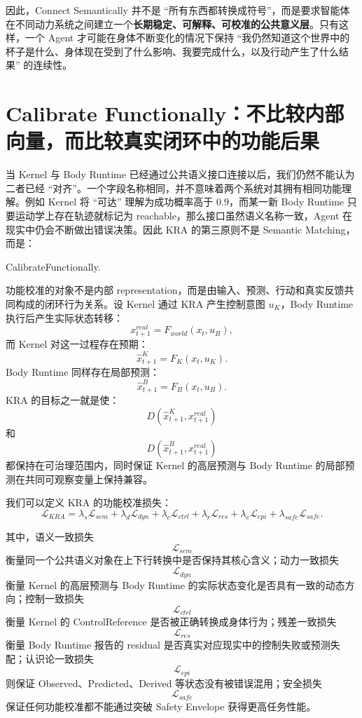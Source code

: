 因此，Connect Semantically 并不是 ``所有东西都转换成符号''，而是要求智能体在不同动力系统之间建立一个\textbf{长期稳定、可解释、可校准的公共意义层}。只有这样，一个 Agent 才可能在身体不断变化的情况下保持 ``我仍然知道这个世界中的杯子是什么、身体现在受到了什么影响、我要完成什么，以及行动产生了什么结果'' 的连续性。

\section{Calibrate Functionally：不比较内部向量，而比较真实闭环中的功能后果}

当 Kernel 与 Body Runtime 已经通过公共语义接口连接以后，我们仍然不能认为二者已经 ``对齐''。一个字段名称相同，并不意味着两个系统对其拥有相同功能理解。例如 Kernel 将 ``可达'' 理解为成功概率高于 $0.9$，而某一新 Body Runtime 只要运动学上存在轨迹就标记为 reachable，那么接口虽然语义名称一致，Agent 在现实中仍会不断做出错误决策。因此 KRA 的第三原则不是 Semantic Matching，而是：
\begin{statementbox}
CalibrateFunctionally.
\end{statementbox}

功能校准的对象不是内部 representation，而是由输入、预测、行动和真实反馈共同构成的闭环行为关系。设 Kernel 通过 KRA 产生控制意图 $u_K$，Body Runtime 执行后产生实际状态转移：
\[
x_{t+1}^{real}
=
F_{world}(x_t,u_B),
\]
而 Kernel 对这一过程存在预期：
\[
\hat x_{t+1}^{K}
=
F_K(x_t,u_K).
\]
Body Runtime 同样存在局部预测：
\[
\hat x_{t+1}^{B}
=
F_B(x_t,u_B).
\]
KRA 的目标之一就是使：
\[
D(
\hat x_{t+1}^{K},
x_{t+1}^{real}
)
\]
和
\[
D(
\hat x_{t+1}^{B},
x_{t+1}^{real}
)
\]
都保持在可治理范围内，同时保证 Kernel 的高层预测与 Body Runtime 的局部预测在共同可观察变量上保持兼容。

我们可以定义 KRA 的功能校准损失：
\[
\mathcal L_{KRA}
=
\lambda_s\mathcal L_{sem}
+
\lambda_d\mathcal L_{dyn}
+
\lambda_c\mathcal L_{ctrl}
+
\lambda_r\mathcal L_{res}
+
\lambda_e\mathcal L_{epi}
+
\lambda_{safe}\mathcal L_{safe}.
\]

其中，语义一致损失
\[
\mathcal L_{sem}
\]
衡量同一个公共语义对象在上下行转换中是否保持其核心含义；动力一致损失
\[
\mathcal L_{dyn}
\]
衡量 Kernel 的高层预测与 Body Runtime 的实际状态变化是否具有一致的动态方向；控制一致损失
\[
\mathcal L_{ctrl}
\]
衡量 Kernel 的 ControlReference 是否被正确转换成身体行为；残差一致损失
\[
\mathcal L_{res}
\]
衡量 Body Runtime 报告的 residual 是否真实对应现实中的控制失败或预测失配；认识论一致损失
\[
\mathcal L_{epi}
\]
则保证 Observed、Predicted、Derived 等状态没有被错误混用；安全损失
\[
\mathcal L_{safe}
\]
保证任何功能校准都不能通过突破 Safety Envelope 获得更高任务性能。


